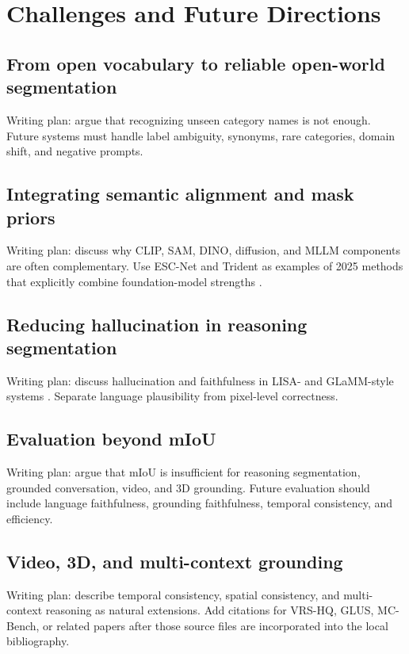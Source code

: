 \section{Challenges and Future Directions}
\label{sec:future-directions}

\subsection{From open vocabulary to reliable open-world segmentation}
\label{subsec:reliable-open-world}
Writing plan: argue that recognizing unseen category names is not enough. Future systems must handle label ambiguity, synonyms, rare categories, domain shift, and negative prompts.

\subsection{Integrating semantic alignment and mask priors}
\label{subsec:semantic-mask-integration}
Writing plan: discuss why CLIP, SAM, DINO, diffusion, and MLLM components are often complementary. Use ESC-Net and Trident as examples of 2025 methods that explicitly combine foundation-model strengths \citep{lee2025escnet,shi2025trident}.

\subsection{Reducing hallucination in reasoning segmentation}
\label{subsec:hallucination-reasoning}
Writing plan: discuss hallucination and faithfulness in LISA- and GLaMM-style systems \citep{lai2024lisa,rasheed2024glamm}. Separate language plausibility from pixel-level correctness.

\subsection{Evaluation beyond mIoU}
\label{subsec:evaluation-beyond-miou}
Writing plan: argue that mIoU is insufficient for reasoning segmentation, grounded conversation, video, and 3D grounding. Future evaluation should include language faithfulness, grounding faithfulness, temporal consistency, and efficiency.

\subsection{Video, 3D, and multi-context grounding}
\label{subsec:future-video-3d}
Writing plan: describe temporal consistency, spatial consistency, and multi-context reasoning as natural extensions. Add citations for VRS-HQ, GLUS, MC-Bench, or related papers after those source files are incorporated into the local bibliography.

